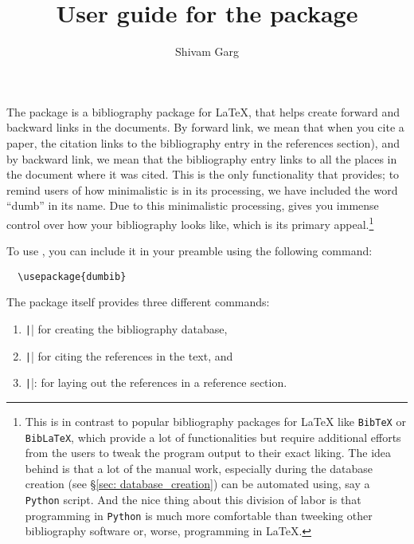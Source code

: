 \documentclass[letter, 11pt]{article}
\title{User guide for the \dumbib package}
\author{Shivam Garg}
\date{}
\begin{document}
\maketitle

The package \dumbib is a bibliography package for \LaTeX{}, that helps create forward and backward links in the documents. By forward link, we mean that when you cite a paper, the citation links to the bibliography entry in the references section), and by backward link, we mean that the bibliography entry links to all the places in the document where it was cited. This is the only functionality that \dumbib provides; to remind users of how minimalistic \dumbib is in its processing, we have included the word ``dumb'' in its name. Due to this minimalistic processing, \dumbib gives you immense control over how your bibliography looks like, which is its primary appeal.\footnote{This is in contrast to popular bibliography packages for \LaTeX{} like \texttt{BibTeX} or \texttt{BibLaTeX}, which provide a lot of functionalities but require additional efforts from the users to tweak the program output to their exact liking. The idea behind \dumbib is that a lot of the manual work, especially during the database creation (see \S \ref{sec: database_creation}) can be automated using, say a \texttt{Python} script. And the nice thing about this division of labor is that programming in \texttt{Python} is much more comfortable than tweeking other bibliography software or, worse, programming in \LaTeX{}.}

To use \dumbib, you can include it in your preamble using the following command:
\begin{verbatim}
  \usepackage{dumbib}
\end{verbatim}
The package itself provides three different commands:
\begin{enumerate}
\item \texttt|\dumbibReferenceEntry{}| for creating the bibliography database,
\item \texttt|\cite{}| for citing the references in the text, and
\item \texttt|\dumbibCreateBibliography|: for laying out the references in a reference section.
\end{enumerate}
\end{document}
